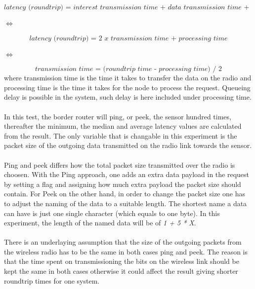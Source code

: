 \begin{equation} \label{eq:1}
\textit{latency (roundtrip) = interest transmission time + data transmission time + processing time}
\end{equation}
\begin{center}$\Leftrightarrow$\end{center}
\begin{equation} \label{eq:2}
\textit{latency (roundtrip) = 2 x transmission time + processing time}
\end{equation}
\begin{center}$\Leftrightarrow$\end{center}
\begin{equation} \label{eq:3}
\textit{transmission time = (roundtrip time - processing time) / 2}
\end{equation}
where transmission time is the time it takes to transfer the data on the radio and processing time is the time it takes for the node to process the request. Queueing delay is possible in the system, such delay is here included under processing time.
\\\\
In this test, the border router will ping, or peek, the sensor hundred times, thereafter the minimum, the median and average latency values are calculated from the result.  
The only variable that is changable in this experiment is the packet size of the outgoing data transmitted on the radio link towards the sensor.
\\\\
Ping and peek differs how the total packet size transmitted over the radio is choosen. With the Ping approach, one adds an extra data payload in the request by setting a flag and assigning how much extra payload the packet size should contain. For Peek on the other hand, in order to change the packet size one has to adjust the naming of the data to a suitable length. The shortest name a data can have is just one single character (which equals to one byte). In this experiment, the length of the named data will be of \textit{1 + 5 * X}.
\\\\
There is an underlaying assumption that the size of the outgoing packets from the wireless radio has to be the same in both cases ping and peek. The reason is that the time spent on transmissioning the bits on the wireless link should be kept the same in both cases otherwise it could affect the result giving shorter roundtrip times for one system.
